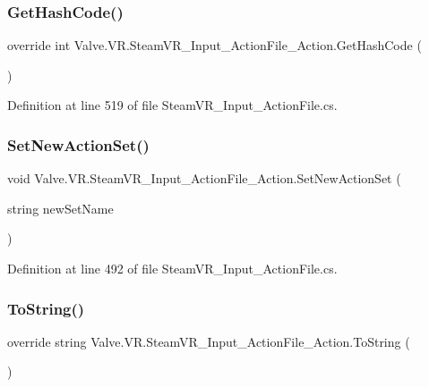 \subsubsection{\texorpdfstring{GetHashCode()}{GetHashCode()}}
{\footnotesize\ttfamily override int Valve.\+V\+R.\+Steam\+V\+R\+\_\+\+Input\+\_\+\+Action\+File\+\_\+\+Action.\+Get\+Hash\+Code (\begin{DoxyParamCaption}{ }\end{DoxyParamCaption})}



Definition at line 519 of file Steam\+V\+R\+\_\+\+Input\+\_\+\+Action\+File.\+cs.

\mbox{\label{class_valve_1_1_v_r_1_1_steam_v_r___input___action_file___action_af6f6695aae717700920dff5fb3b8dd2a}} 
\subsubsection{\texorpdfstring{SetNewActionSet()}{SetNewActionSet()}}
{\footnotesize\ttfamily void Valve.\+V\+R.\+Steam\+V\+R\+\_\+\+Input\+\_\+\+Action\+File\+\_\+\+Action.\+Set\+New\+Action\+Set (\begin{DoxyParamCaption}\item[{string}]{new\+Set\+Name }\end{DoxyParamCaption})}



Definition at line 492 of file Steam\+V\+R\+\_\+\+Input\+\_\+\+Action\+File.\+cs.

\mbox{\label{class_valve_1_1_v_r_1_1_steam_v_r___input___action_file___action_a4518cee0a49cfff12d5ae1d5ea9f209f}} 
\subsubsection{\texorpdfstring{ToString()}{ToString()}}
{\footnotesize\ttfamily override string Valve.\+V\+R.\+Steam\+V\+R\+\_\+\+Input\+\_\+\+Action\+File\+\_\+\+Action.\+To\+String (\begin{DoxyParamCaption}{ }\end{DoxyParamCaption})}



